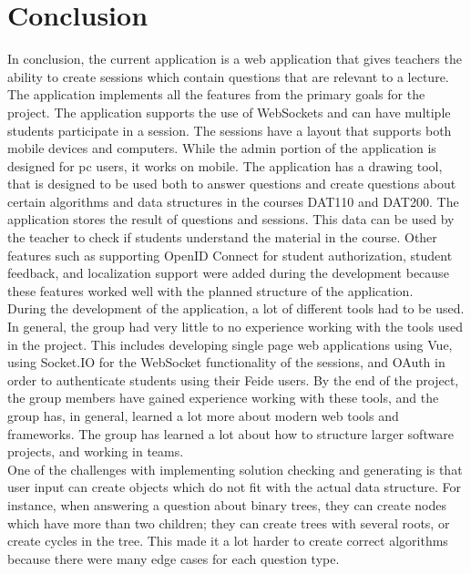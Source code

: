 \section{Conclusion}
In conclusion, the current application is a web application that gives teachers the ability to create sessions which contain questions that are relevant to a lecture. The application implements all the features from the primary goals for the project. The application supports the use of WebSockets and can have multiple students participate in a session. The sessions have a layout that supports both mobile devices and computers. While the admin portion of the application is designed for pc users, it works on mobile. The application has a drawing tool, that is designed to be used both to answer questions and create questions about certain algorithms and data structures in the courses DAT110 and DAT200. The application stores the result of questions and sessions. This data can be used by the teacher to check if students understand the material in the course. Other features such as supporting OpenID Connect for student authorization, student feedback, and localization support were added during the development because these features worked well with the planned structure of the application. 
\\[11pt]
During the development of the application, a lot of different tools had to be used. In general, the group had very little to no experience working with the tools used in the project. This includes developing single page web applications using Vue, using Socket.IO for the WebSocket functionality of the sessions, and OAuth in order to authenticate students using their Feide users. By the end of the project, the group members have gained experience working with these tools, and the group has, in general, learned a lot more about modern web tools and frameworks. The group has learned a lot about how to structure larger software projects, and working in teams.
\\[11pt]
One of the challenges with implementing solution checking and generating is that user input can create objects which do not fit with the actual data structure. For instance, when answering a question about binary trees, they can create nodes which have more than two children; they can create trees with several roots, or create cycles in the tree. This made it a lot harder to create correct algorithms because there were many edge cases for each question type. 

